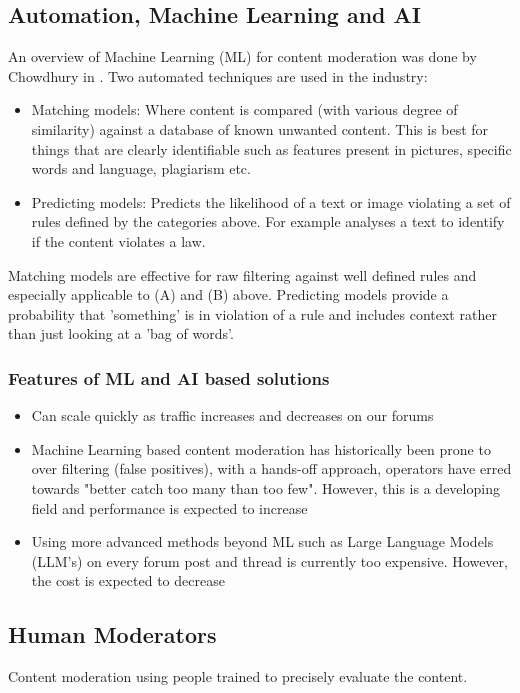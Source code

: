 \documentclass[
	letterpaper, %
	12pt, %
	unnumberedsections, %
	twoside, %
]{LTJournalArticle}
\begin{document}
\subsection{Automation, Machine Learning and AI}
An overview of Machine Learning (ML) for content moderation was done by Chowdhury in \cite{StanfordPrimer}. Two automated techniques are used in the industry:
\begin{itemize}
	\item Matching models: Where content is compared (with various degree of similarity) against a database of known unwanted content. This is best for things that are clearly identifiable such as features present in pictures, specific words and language, plagiarism etc.
	\item Predicting models: Predicts the likelihood of a text or image violating a set of rules defined by the categories above. For example analyses a text to identify if the content violates a law.
\end{itemize}

Matching models are effective for raw filtering against well defined rules and especially applicable to (A) and (B) above. Predicting models provide a probability that 'something' is in violation of a rule and includes context rather than just looking at a 'bag of words'.

\subsubsection*{Features of ML and AI based solutions}
\begin{itemize}
	\item Can scale quickly as traffic increases and decreases on our forums
	\item Machine Learning based content moderation has historically been prone to over filtering (false positives), with a hands-off approach, operators have erred towards "better catch too many than too few". However, this is a developing field and performance is expected to increase
	\item Using more advanced methods beyond ML such as Large Language Models (LLM's) on every forum post and thread is currently too expensive. However, the  cost is expected to decrease
\end{itemize}

\subsection{Human Moderators}
Content moderation using people trained to precisely evaluate the content.
\end{document}
